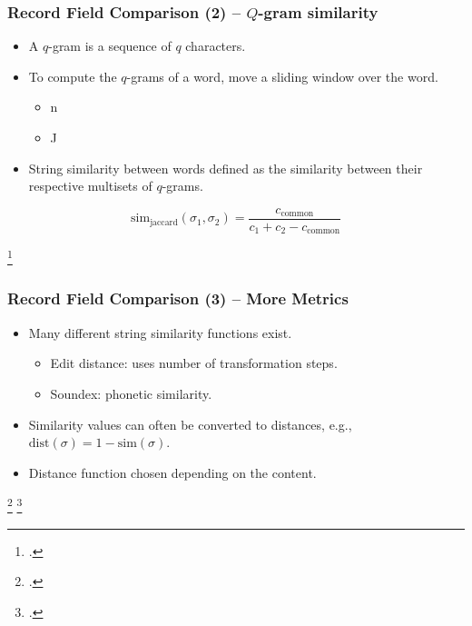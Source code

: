 \documentclass[12pt]{beamer}
\theoremstyle{break}
\begin{document}
\begin{frame}
	\frametitle{Record Field Comparison (2) -- $Q$-gram similarity}
	
	\begin{itemize}
		\item A $q$-gram is a sequence of $q$ characters.
		\item To compute the $q$-grams of a word, move a sliding window over the word.\begin{itemize}
				\item {}n
				\item J
			\end{itemize}
		\item String similarity between words defined as the similarity between their respective multisets of $q$-grams.\footnotemark
	\end{itemize}
	
	\pause
	
	\begin{equation*}
		\textrm{sim}_{\textrm{jaccard}}(\sigma_1, \sigma_2) = \frac{c_{\textrm{common}}}{c_1 + c_2 - c_{\textrm{common}}}
	\end{equation*}
	
	\footcitetext{Ukkonen1992}

\end{frame}




\begin{frame}
	\frametitle{Record Field Comparison (3) -- More Metrics}
	
	\begin{itemize}
		\item Many different string similarity functions exist. \begin{itemize}
			\item Edit distance\footnotemark: uses number of transformation steps.
			\item Soundex\footnotemark: phonetic similarity.
		\end{itemize}
		\item Similarity values can often be converted to distances, e.g., $\mathrm{dist}(\sigma)=1-\mathrm{sim}(\sigma)$.
		\item Distance function chosen depending on the content.
	\end{itemize}
	
	\footcitetext{Levenshtein1966}
	\footcitetext{Soundex}
	
\end{frame}
\end{document}

